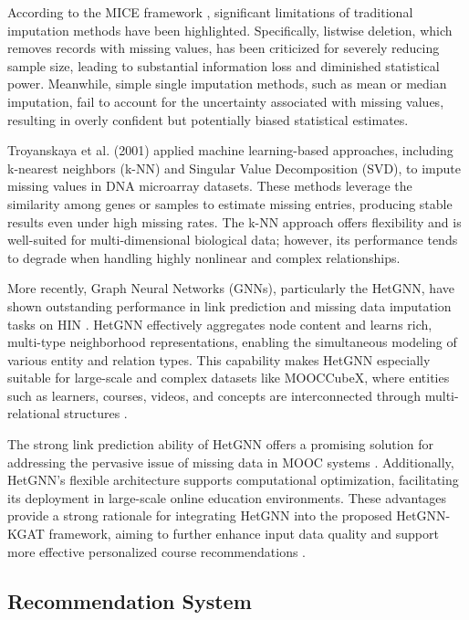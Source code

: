 \documentclass{ieeeaccess}
\begin{document}
According to the MICE framework \cite{van2011mice}, significant limitations of traditional imputation methods have been highlighted. Specifically, listwise deletion, which removes records with missing values, has been criticized for severely reducing sample size, leading to substantial information loss and diminished statistical power. Meanwhile, simple single imputation methods, such as mean or median imputation, fail to account for the uncertainty associated with missing values, resulting in overly confident but potentially biased statistical estimates.

Troyanskaya et al. (2001) \cite{troyanskaya2001missingDNA} applied machine learning-based approaches, including k-nearest neighbors (k-NN) and Singular Value Decomposition (SVD), to impute missing values in DNA microarray datasets. These methods leverage the similarity among genes or samples to estimate missing entries, producing stable results even under high missing rates. The k-NN approach offers flexibility and is well-suited for multi-dimensional biological data; however, its performance tends to degrade when handling highly nonlinear and complex relationships.

More recently, Graph Neural Networks (GNNs), particularly the HetGNN, have shown outstanding performance in link prediction and missing data imputation tasks on HIN \cite{zhang2019hetgnn}. HetGNN effectively aggregates node content and learns rich, multi-type neighborhood representations, enabling the simultaneous modeling of various entity and relation types. This capability makes HetGNN especially suitable for large-scale and complex datasets like MOOCCubeX, where entities such as learners, courses, videos, and concepts are interconnected through multi-relational structures \cite{yu2021mooccubex}.

The strong link prediction ability of HetGNN offers a promising solution for addressing the pervasive issue of missing data in MOOC systems \cite{kizilcec2015attrition_missing_MOOC}. Additionally, HetGNN’s flexible architecture supports computational optimization, facilitating its deployment in large-scale online education environments. These advantages provide a strong rationale for integrating HetGNN into the proposed HetGNN-KGAT framework, aiming to further enhance input data quality and support more effective personalized course recommendations \cite{zhang2019hetgnn, wang2019kgat}.

\subsection{Recommendation System} 
\end{document}
